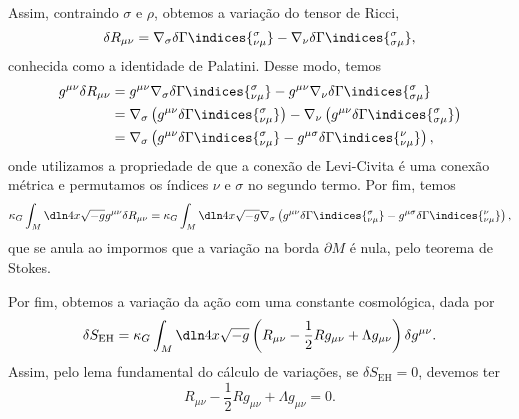 Assim, contraindo \(\sigma\) e \(\rho\), obtemos a variação do tensor de Ricci,
\begin{equation*}
    \delta R_{\mu\nu} = \nabla_{\sigma} \delta \Gamma\indices{^\sigma_{\nu \mu}} - \nabla_{\nu}\delta \Gamma\indices{^\sigma_{\sigma \mu}},
\end{equation*}
conhecida como a identidade de Palatini. Desse modo, temos
\begin{align*}
    g^{\mu\nu}\delta R_{\mu\nu} &= g^{\mu\nu}\nabla_{\sigma} \delta \Gamma\indices{^\sigma_{\nu \mu}} - g^{\mu\nu}\nabla_{\nu}\delta \Gamma\indices{^\sigma_{\sigma \mu}}\\
                                &= \nabla_{\sigma}\left(g^{\mu\nu}\delta \Gamma\indices{^\sigma_{\nu\mu}}\right)- \nabla_{\nu}\left(g^{\mu\nu}\delta \Gamma\indices{^\sigma_{\sigma \mu}}\right)\\
                                &= \nabla_{\sigma}\left(g^{\mu\nu}\delta \Gamma\indices{^\sigma_{\nu\mu}}- g^{\mu\sigma}\delta \Gamma\indices{^\nu_{\nu \mu}}\right),
\end{align*}
onde utilizamos a propriedade de que a conexão de Levi-Civita é uma conexão métrica e permutamos os índices \(\nu \) e \(\sigma\) no segundo termo. Por fim, temos
\begin{equation*}
    \kappa_G \int_M \dln4x \sqrt{-g} g^{\mu\nu}\delta R_{\mu\nu} = \kappa_G \int_M \dln4x\sqrt{-g} \nabla_{\sigma}\left(g^{\mu\nu}\delta \Gamma\indices{^\sigma_{\nu\mu}}- g^{\mu\sigma}\delta \Gamma\indices{^\nu_{\nu \mu}}\right),
\end{equation*}
que se anula ao impormos que a variação na borda \(\partial M\) é nula, pelo teorema de Stokes.

Por fim, obtemos a variação da ação com uma constante cosmológica, dada por
\begin{equation*}
    \delta S_\mathrm{EH} = \kappa_G \int_M \dln4x \sqrt{-g} \left(R_{\mu\nu} - \frac12Rg_{\mu\nu} + \Lambda g_{\mu\nu}\right) \delta g^{\mu\nu}.
\end{equation*}
Assim, pelo lema fundamental do cálculo de variações, se \(\delta S_\mathrm{EH} = 0\), devemos ter
\begin{equation*}
    R_{\mu\nu} - \frac12 R g_{\mu\nu} + \Lambda g_{\mu\nu} = 0.
\end{equation*}

